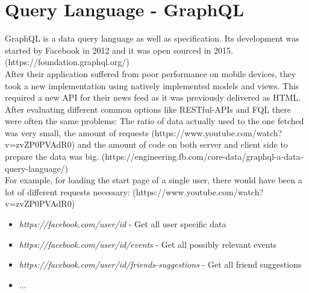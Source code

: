 \section{Query Language - GraphQL}
GraphQL is a data query language as well as specification. Its development was started by Facebook in 2012 and it was open sourced in 2015. (https://foundation.graphql.org/)\\
After their application suffered from poor performance on mobile devices, they took a new implementation using natively implemented models and views. This required a new API for their news feed as it was previously delivered as HTML.\\
After evaluating different common options like RESTful-APIs and FQL there were often the same problems:  The ratio of data actually used to the one fetched was very small, the amount of requests (https://www.youtube.com/watch?v=zvZP0PVAdR0) and the amount of code on both server and client side to prepare the data was big. (https://engineering.fb.com/core-data/graphql-a-data-query-language/)\\
For example, for loading the start page of a single user, there would have been a lot of different requests necessary: (https://www.youtube.com/watch?v=zvZP0PVAdR0)
\begin{itemize}
\item \emph{https://facebook.com/user/id} - Get all user specific data
\item \emph{https://facebook.com/user/id/events} - Get all possibly relevant events
\item \emph{https://facebook.com/user/id/friends-suggestions} - Get all friend suggestions
\item ...
\end{itemize}

